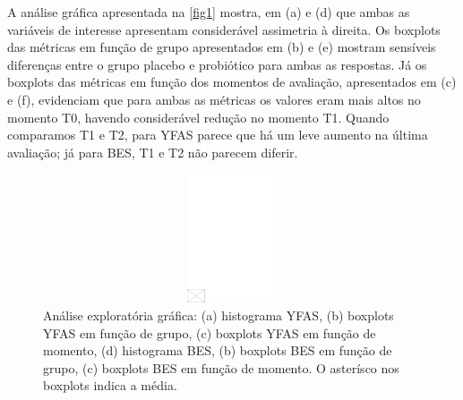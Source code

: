 \documentclass[AMA,STIX1COL]{WileyNJD-v2}
\begin{document}

A análise gráfica apresentada na \autoref{fig1} mostra, em (a) e (d) que ambas as variáveis de interesse apresentam considerável assimetria à direita. Os boxplots das métricas em função de grupo apresentados em (b) e (e) mostram sensíveis diferenças entre o grupo placebo e probiótico para ambas as respostas. Já os boxplots das métricas em função dos momentos de avaliação, apresentados em (c) e (f), evidenciam que para ambas as métricas os valores eram mais altos no momento T0, havendo considerável redução no momento T1. Quando comparamos T1 e T2, para YFAS parece que há um leve aumento na última avaliação; já para BES, T1 e T2 não parecem diferir.  

\begin{figure}[h]
\centerline{\includegraphics[width=342pt,height=9pc,draft]{empty}}
\caption{Análise exploratória gráfica: (a) histograma YFAS, (b) boxplots YFAS em função de grupo, (c) boxplots YFAS em função de momento, (d) histograma BES, (b) boxplots BES em função de grupo, (c) boxplots BES em função de momento. O asterísco nos boxplots indica a média.\label{fig1}}
\end{figure}
\end{document}
